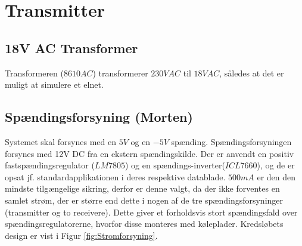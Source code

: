 \section{Transmitter}

\subsection{18V AC Transformer}
Transformeren ($8610AC$)\cite{lib:Adaptor} transformerer $230V AC$ til $18V AC$, således at det er muligt at simulere et elnet.

\subsection{Spændingsforsyning (Morten)}
Systemet skal forsynes med en $5V$ og en $-5V$ spænding. Spændingsforsyningen forsynes med 12V DC fra en ekstern spændingskilde. Der er anvendt en positiv fastspændingsregulator ($LM7805$)\cite{lib:LM7805} og en spændings-inverter($ICL7660$)\cite{lib:IC7660}, og de er opsat jf. standardapplikationen i deres respektive datablade.
$500 mA$ er den den mindste tilgængelige sikring, derfor er denne valgt, da der ikke forventes en samlet strøm, der er større end dette i nogen af de tre spændingsforsyninger (transmitter og to receivere). Dette giver et forholdsvis stort spændingsfald over spændingsregulatorerne, hvorfor disse monteres med køleplader. 
Kredsløbets design er vist i Figur \ref{fig:Stromforsyning}.
